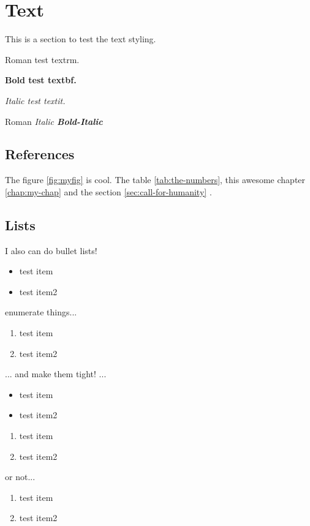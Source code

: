 \documentclass[9pt]{memoir}
\begin{document}
\section{Text}

This is a section to test the text styling.

\textrm{Roman test textrm.}

\textbf{Bold test textbf.}

\textit{Italic test textit.}

\textrm{Roman \textit{Italic \textbf{Bold-Italic}}}

\subsection{References}

The figure \ref{fig:myfig} is cool. The table \ref{tab:the-numbers}, this awesome chapter \ref{chap:my-chap} and the section \ref{sec:call-for-humanity} .

\subsection{Lists}

I also can do bullet lists!

\begin{itemize}
\item test item
\item test item2
\end{itemize}

enumerate things...

\begin{enumerate}
\item test item
\item test item2
\end{enumerate}

... and make them tight! ...

\begin{itemize}
\tightlist
\item test item
\item test item2
\end{itemize}

\begin{enumerate}
\tightlist
\item test item
\item test item2
\end{enumerate}

or not...
\begin{enumerate}
\item test item
\item test item2
\end{enumerate}
\end{document}
